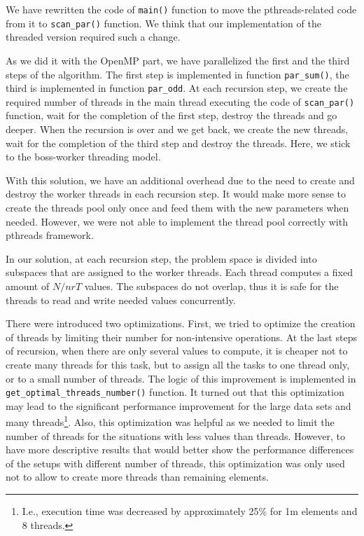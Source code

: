 \documentclass[a4paper,10pt,notitlepage]{article}
\begin{document}
We have rewritten the code of \lstinline{main()} function to move the pthreads-related code from it to \lstinline{scan_par()} function. We think that our implementation of the threaded version required such a change. 

As we did it with the OpenMP part, we have parallelized the first and the third steps of the algorithm. The first step is implemented in function \lstinline{par_sum()}, the third is implemented in function \lstinline{par_odd}. At each recursion step, we create the required number of threads in the main thread executing the code of \lstinline{scan_par()} function, wait for the completion of the first step, destroy the threads and go deeper. When the recursion is over and we get back, we create the new threads, wait for the completion of the third step and destroy the threads. Here, we stick to the boss-worker threading model.

With this solution, we have an additional overhead due to the need to create and destroy the worker threads in each recursion step. It would make more sense to create the threads pool only once and feed them with the new parameters when needed. However, we were not able to implement the thread pool correctly with pthreads framework.

In our solution, at each recursion step, the problem space is divided into subspaces that are assigned to the worker threads. Each thread computes a fixed amount of $N/nrT$ values. The subspaces do not overlap, thus it is safe for the threads to read and write needed values concurrently.

There were introduced two optimizations. First, we tried to optimize the creation of threads by limiting their number for non-intensive operations. At the last steps of recursion, when there are only several values to compute, it is cheaper not to create many threads for this task, but to assign all the tasks to one thread only, or to a small number of threads. The logic of this improvement is implemented in \lstinline{get_optimal_threads_number()} function. It turned out that this optimization may lead to the significant performance improvement for the large data sets and many threads\footnote{I.e., execution time was decreased by approximately 25\% for 1m elements and 8 threads.}. Also, this optimization was helpful as we needed to limit the number of threads for the situations with less values than threads. However, to have more descriptive results that would better show the performance differences of the setups with different number of threads, this optimization was only used not to allow to create more threads than remaining elements.
\end{document}
